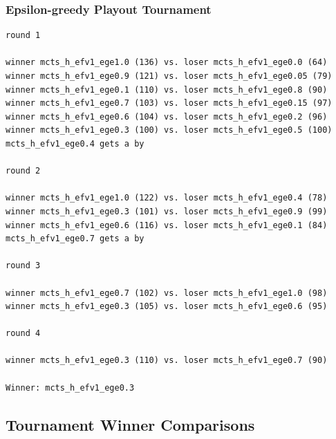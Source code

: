 \documentclass{article}
\begin{document}
\subsubsection{Epsilon-greedy Playout Tournament}

\begin{verbatim}
round 1

winner mcts_h_efv1_ege1.0 (136) vs. loser mcts_h_efv1_ege0.0 (64)
winner mcts_h_efv1_ege0.9 (121) vs. loser mcts_h_efv1_ege0.05 (79)
winner mcts_h_efv1_ege0.1 (110) vs. loser mcts_h_efv1_ege0.8 (90)
winner mcts_h_efv1_ege0.7 (103) vs. loser mcts_h_efv1_ege0.15 (97)
winner mcts_h_efv1_ege0.6 (104) vs. loser mcts_h_efv1_ege0.2 (96)
winner mcts_h_efv1_ege0.3 (100) vs. loser mcts_h_efv1_ege0.5 (100)
mcts_h_efv1_ege0.4 gets a by

round 2

winner mcts_h_efv1_ege1.0 (122) vs. loser mcts_h_efv1_ege0.4 (78)
winner mcts_h_efv1_ege0.3 (101) vs. loser mcts_h_efv1_ege0.9 (99)
winner mcts_h_efv1_ege0.6 (116) vs. loser mcts_h_efv1_ege0.1 (84)
mcts_h_efv1_ege0.7 gets a by

round 3

winner mcts_h_efv1_ege0.7 (102) vs. loser mcts_h_efv1_ege1.0 (98)
winner mcts_h_efv1_ege0.3 (105) vs. loser mcts_h_efv1_ege0.6 (95)

round 4

winner mcts_h_efv1_ege0.3 (110) vs. loser mcts_h_efv1_ege0.7 (90)

Winner: mcts_h_efv1_ege0.3
\end{verbatim}

\subsection{Tournament Winner Comparisons}

\end{document}
